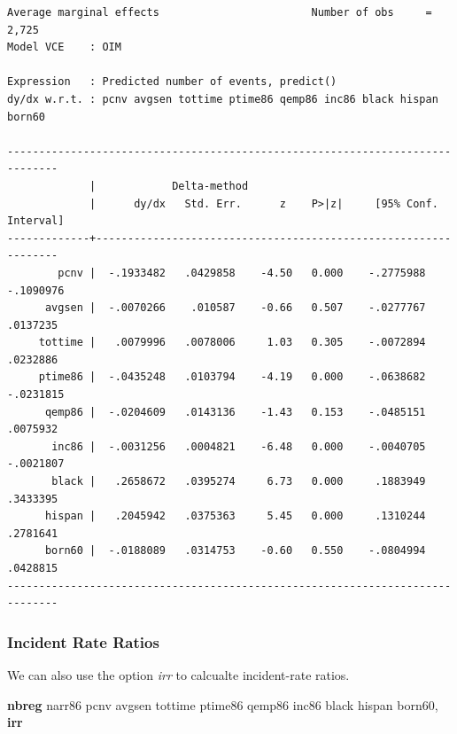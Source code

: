 \documentclass[
]{book}
\newenvironment{Shaded}{\begin{snugshade}}{\end{snugshade}}
\newcommand{\BaseNTok}[1]{\textcolor[rgb]{0.00,0.00,0.81}{#1}}
\newcommand{\KeywordTok}[1]{\textcolor[rgb]{0.13,0.29,0.53}{\textbf{#1}}}
\newcommand{\NormalTok}[1]{#1}
\begin{document}
\begin{verbatim}
Average marginal effects                        Number of obs     =      2,725
Model VCE    : OIM

Expression   : Predicted number of events, predict()
dy/dx w.r.t. : pcnv avgsen tottime ptime86 qemp86 inc86 black hispan born60

------------------------------------------------------------------------------
             |            Delta-method
             |      dy/dx   Std. Err.      z    P>|z|     [95% Conf. Interval]
-------------+----------------------------------------------------------------
        pcnv |  -.1933482   .0429858    -4.50   0.000    -.2775988   -.1090976
      avgsen |  -.0070266    .010587    -0.66   0.507    -.0277767    .0137235
     tottime |   .0079996   .0078006     1.03   0.305    -.0072894    .0232886
     ptime86 |  -.0435248   .0103794    -4.19   0.000    -.0638682   -.0231815
      qemp86 |  -.0204609   .0143136    -1.43   0.153    -.0485151    .0075932
       inc86 |  -.0031256   .0004821    -6.48   0.000    -.0040705   -.0021807
       black |   .2658672   .0395274     6.73   0.000     .1883949    .3433395
      hispan |   .2045942   .0375363     5.45   0.000     .1310244    .2781641
      born60 |  -.0188089   .0314753    -0.60   0.550    -.0804994    .0428815
------------------------------------------------------------------------------
\end{verbatim}

\subsubsection*{Incident Rate Ratios}\label{incident-rate-ratios-1}

We can also use the option \emph{irr} to calcualte incident-rate ratios.

\begin{Shaded}
\begin{Highlighting}[]
\KeywordTok{nbreg}\NormalTok{ narr86 pcnv avgsen tottime ptime86 qemp86 inc86 }\BaseNTok{black}\NormalTok{ hispan born60, }\KeywordTok{irr}
\end{Highlighting}
\end{Shaded}
\end{document}

